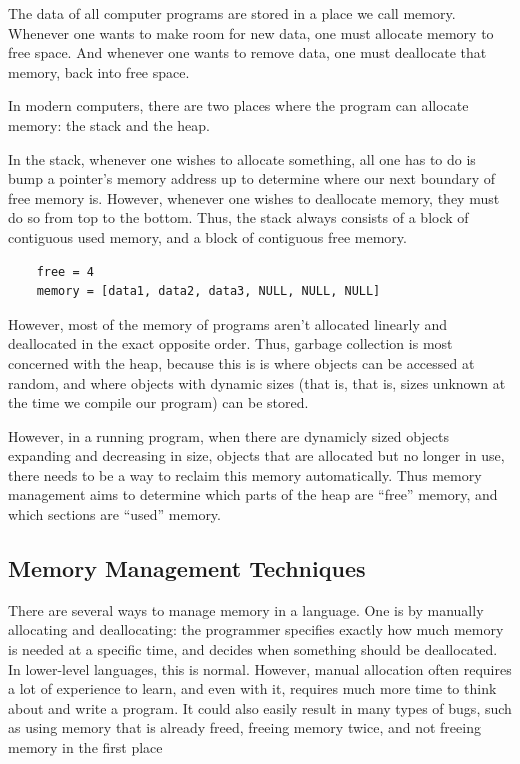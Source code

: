 \documentclass[index]{subfiles}
\begin{document}
The data of all computer programs are stored in a place we call memory. Whenever one wants to make room for new data, one must allocate memory to free space. And whenever one wants to remove data, one must deallocate that memory, back into free space.

In modern computers, there are two places where the program can allocate memory: the stack and the heap\cite{the_rust_programming_language}.

In the stack, whenever one wishes to allocate something, all one has to do is bump a pointer's memory address up to determine where our next boundary of free memory is\cite[Chapter~4.1~What~is~Ownership?]{the_rust_programming_language}. However, whenever one wishes to deallocate memory, they must do so from top to the bottom. Thus, the stack always consists of a block of contiguous used memory, and a block of contiguous free memory.

\begin{verbatim}
    free = 4
    memory = [data1, data2, data3, NULL, NULL, NULL]
\end{verbatim}

However, most of the memory of programs aren't allocated linearly and deallocated in the exact opposite order. Thus, garbage collection is most concerned with the heap, because this is is where objects can be accessed at random, and where objects with dynamic sizes (that is, that is, sizes unknown at the time we compile our program) can be stored.

However, in a running program, when there are dynamicly sized objects expanding and decreasing in size, objects that are allocated but no longer in use, there needs to be a way to reclaim this memory automatically. Thus memory management aims to determine which parts of the heap are ``free'' memory, and which sections are ``used'' memory.

\subsection{Memory Management Techniques}

There are several ways to manage memory in a language. One is by manually allocating and deallocating: the programmer specifies exactly how much memory is needed at a specific time, and decides when something should be deallocated. In lower-level languages, this is normal. However, manual allocation often requires a lot of experience to learn, and even with it, requires much more time to think about and write a program. It could also easily result in many types of bugs, such as using memory that is already freed, freeing memory twice, and not freeing memory in the first place \cites{garbage_collection_overview_uw}[Chapter~1]{gc_handbook}
\end{document}
